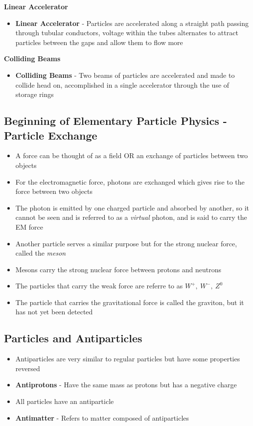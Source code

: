 \textbf{Linear Accelerator}
\begin{itemize}
    \item \textbf{Linear Accelerator} - Particles are accelerated along a straight path passing through tubular conductors, voltage within the tubes alternates to attract particles between the gaps and allow them to flow more
\end{itemize}

\textbf{Colliding Beams}
\begin{itemize}
    \item \textbf{Colliding Beams} - Two beams of particles are accelerated and made to collide head on, accomplished in a single accelerator through the use of storage rings
\end{itemize}

\subsection{Beginning of Elementary Particle Physics - Particle
Exchange}
\begin{itemize}
    \item A force can be thought of as a field OR an exchange of particles between two objects
    \item For the electromagnetic force, photons are exchanged which gives rise to the force between two objects
    \item The photon is emitted by one charged particle and absorbed by another, so it cannot be seen and is referred to as a \emph{virtual} photon, and is said to carry the EM force
    \item Another particle serves a similar purpose but for the strong nuclear force, called the \emph{meson}
    \item Mesons carry the strong nuclear force between protons and neutrons
    \item The particles that carry the weak force are referre to as \(W^+,\ W^-,\ Z^0\)
    \item The particle that carries the gravitational force is called the graviton, but it has not yet been detected
\end{itemize}

\subsection{Particles and Antiparticles}
\begin{itemize}
    \item Antiparticles are very similar to regular particles but have some properties reversed
    \item \textbf{Antiprotons} - Have the same mass as protons but has a negative charge
    \item All particles have an antiparticle
    \item \textbf{Antimatter} - Refers to matter composed of antiparticles
\end{itemize}


